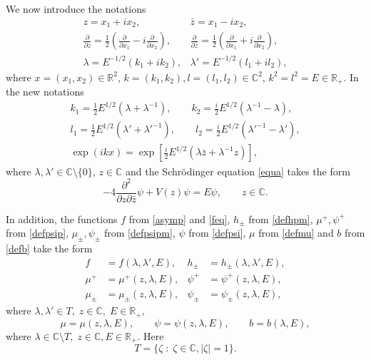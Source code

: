 \documentclass[11pt,a4paper,english,subeqn]{amsart}
\theoremstyle{plain}
\theoremstyle{definition}
\numberwithin{equation}{section}
\begin{document}
We now introduce the notations
\begin{align} \nonumber
&z = x_1 + i x_2,& \bar z = x_1 - i x_2,& \\ \label{notations}
&\frac{\partial}{\partial z} = \frac 1 2 \left( \frac{\partial}{\partial x_1} - i\frac{\partial}{\partial x_2}  \right),& \frac{\partial}{\partial \bar z} = \frac 1 2 \left( \frac{\partial}{\partial x_1} + i\frac{\partial}{\partial x_2}  \right),& \\ \nonumber
&\lambda = E^{-1/2}(k_1 + ik_2),& \lambda' = E^{-1/2}(l_1 +i l_2),&
\end{align}
where $x=(x_1,x_2) \in {\mathbb{R}}^2$, $k=(k_1,k_2),l=(l_1,l_2) \in {\mathbb{C}}^2$, $k^2 = l^2 = E \in {\mathbb{R}}_+$. In the new notations
\begin{subequations}
\begin{gather} \label{defk}
k_1 = \frac 1 2 E^{1/2} (\lambda + \lambda^{-1}), \qquad k_2 = \frac i 2 E^{1/2}(\lambda^{-1}-\lambda), \\
l_1 = \frac 1 2 E^{1/2} (\lambda' + {\lambda'}^{-1}), \qquad l_2 = \frac i 2 E^{1/2}({\lambda'}^{-1}-\lambda'), \\
\exp(ikx) = \exp[\frac i 2 E^{1/2}(\lambda \bar z+\lambda^{-1}z )],
\end{gather}
\end{subequations}
where $\lambda, \lambda' \in {\mathbb{C}} \setminus \{0\}$, $z \in {\mathbb{C}}$ and the Schr\"odinger equation \eqref{equa} takes the form
\begin{equation}
-4\frac{\partial^2}{\partial z \partial \bar z}\psi+V(z)\psi = E \psi, \qquad z \in {\mathbb{C}}.
\end{equation}

In addition, the functions $f$ from \eqref{asymp} and \eqref{feq}, $h_{\pm}$ from \eqref{defhpm}, $\mu^+, \psi^+$ from \eqref{defpsip}, $\mu_{\pm}, \psi_{\pm}$ from \eqref{defpsipm}, $\psi$ from \eqref{defpsi}, $\mu$ from \eqref{defmu} and $b$ from \eqref{defb} take the form
\begin{align} \nonumber
f &=f(\lambda, \lambda', E),& h_{\pm} &=h_{\pm}(\lambda, \lambda', E), \\
\mu^+ &= \mu^+(z,\lambda,E),& \psi^+ &= \psi^+(z,\lambda,E), \\ \nonumber
\mu_{\pm} &= \mu_{\pm}(z,\lambda,E),& \psi_{\pm} &= \psi_{\pm}(z,\lambda,E),
\end{align}
where $\lambda, \lambda' \in T, \; z \in {\mathbb{C}}, \; E \in {\mathbb{R}}_+$,
\begin{equation}
\mu= \mu(z, \lambda, E), \qquad \psi= \psi(z, \lambda, E), \qquad b = b(\lambda,E),
\end{equation}
where $\lambda \in {\mathbb{C}} \setminus T, \; z \in {\mathbb{C}}, E \in {\mathbb{R}}_+$. Here
\begin{equation} \label{defT}
T = \{ \zeta \; : \; \zeta \in {\mathbb{C}}, |\zeta | = 1 \}.
\end{equation}
\end{document}
